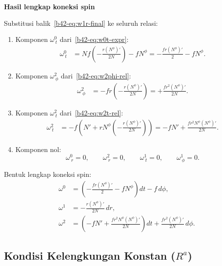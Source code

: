 \vspace{0.5em}
\noindent \textbf{Hasil lengkap koneksi spin}

Substitusi balik~\eqref{b42-eq:w1r-final} ke seluruh relasi:
 
\begin{enumerate}
    \item Komponen $\omega^0_{\ t}$ dari~\eqref{b42-eq:w0t-expr}:
    \begin{align}
        \omega^0_{\ t} &= Nf\!\left(-\frac{r(N^\phi)'}{2N}\right) - fN^\phi = -\frac{fr(N^\phi)'}{2} - fN^\phi. \label{b42-eq:w0t-final}
    \end{align}

    \item Komponen $\omega^2_{\ \phi}$ dari~\eqref{b42-eq:w2phi-rel}:
    \begin{align}
        \omega^2_{\ \phi} &= -fr\!\left(-\frac{r(N^\phi)'}{2N}\right) = +\frac{fr^2(N^\phi)'}{2N}. \label{b42-eq:w2phi-final}
    \end{align}

    \item Komponen $\omega^2_{\ t}$ dari~\eqref{b42-eq:w2t-rel}:
    \begin{align}
        \omega^2_{\ t} &= -f\!\left(N' + rN^\phi\!\left(-\frac{r(N^\phi)'}{2N}\right)\right) = -fN' + \frac{fr^2N^\phi(N^\phi)'}{2N}. \label{b42-eq:w2t-final}
    \end{align}

    \item Komponen nol:
    \begin{equation}
        \omega^0_{\ r} = 0, \qquad \omega^2_{\ r} = 0, \qquad \omega^1_{\ t} = 0, \qquad \omega^1_{\ \phi} = 0.
    \end{equation}
\end{enumerate}
 
\noindent Bentuk lengkap koneksi spin:
\begin{align}
    \omega^0 &= \left(-\frac{fr(N^\phi)'}{2} - fN^\phi\right)dt - f\,d\phi, \label{b42-eq:omega0-full}\\[8pt]
    \omega^1 &= -\frac{r(N^\phi)'}{2N}\,dr, \label{b42-eq:omega1-full}\\[8pt]
    \omega^2 &= \left(-fN' + \frac{fr^2N^\phi(N^\phi)'}{2N}\right)dt + \frac{fr^2(N^\phi)'}{2N}\,d\phi. \label{b42-eq:omega2-full}
\end{align}

\subsection{Kondisi Kelengkungan Konstan ($R^a$)}
\label{b42-sec:curvature}

